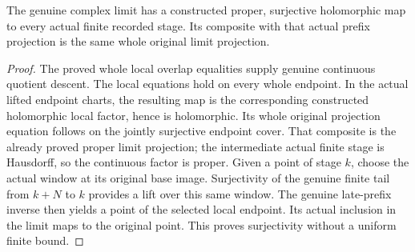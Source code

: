 \begin{theorem}
\label{hir:actual-locally-finite-history-finite-stage-factors}
\leanok
The genuine complex limit has a constructed proper, surjective holomorphic
map to every actual finite recorded stage. Its composite with that actual
prefix projection is the same whole original limit projection.
\end{theorem}
\begin{proof}
The proved whole local overlap equalities supply genuine continuous quotient
descent. The local equations hold on every whole endpoint. In the actual
lifted endpoint charts, the resulting map is the corresponding constructed
holomorphic local factor, hence is holomorphic. Its whole original
projection equation follows on the jointly surjective endpoint cover.
That composite is the already proved proper limit projection; the
intermediate actual finite stage is Hausdorff, so the continuous factor is
proper. Given a point of stage $k$, choose the actual window at its original
base image. Surjectivity of the genuine finite tail from $k+N$ to $k$
provides a lift over this same window. The genuine late-prefix inverse
then yields a point of the selected local endpoint. Its actual inclusion
in the limit maps to the original point. This proves surjectivity without
a uniform finite bound.
\end{proof}

